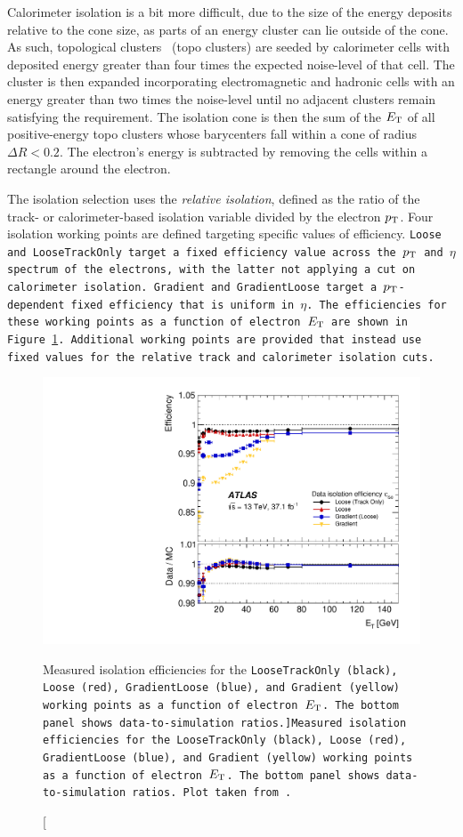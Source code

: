 Calorimeter isolation is a bit more difficult, due to the size of the energy deposits relative to the cone size, as parts of an energy cluster can lie outside of the cone.
As such, topological clusters~\cite{2017.topo-clustering} (topo clusters) are seeded by calorimeter cells with deposited energy greater than four times the expected noise-level of that cell.
The cluster is then expanded incorporating electromagnetic and hadronic cells with an energy greater than two times the noise-level until no adjacent clusters remain satisfying the requirement.
The isolation cone is then the sum of the $E_{\mathrm{T}}$ of all positive-energy topo clusters whose barycenters fall within a cone of radius $\Delta R < 0.2$.
The electron's energy is subtracted by removing the cells within a rectangle around the electron.

The isolation selection uses the \emph{relative isolation}, defined as the ratio of the track- or calorimeter-based isolation variable divided by the electron $p_{\mathrm{T}}$.
Four isolation working points are defined targeting specific values of efficiency.
\tt{Loose} and \tt{LooseTrackOnly} target a fixed efficiency value across the $p_{\mathrm{T}}$ and $\eta$ spectrum of the electrons, with the latter not applying a cut on calorimeter isolation.
\tt{Gradient} and \tt{GradientLoose} target a $p_{\mathrm{T}}$-dependent fixed efficiency that is uniform in $\eta$.
The efficiencies for these working points as a function of electron $E_{\mathrm{T}}$ are shown in Figure~\ref{fig:electron_iso_efficiency}.
Additional working points are provided that instead use fixed values for the relative track and calorimeter isolation cuts.

\begin{figure}[htbp]
  \centering
  \includegraphics[width=.6\textwidth]{figs/detector/electron_iso_efficiency}
  \caption[Measured isolation efficiencies for the \tt{LooseTrackOnly} (black), \tt{Loose} (red), \tt{GradientLoose} (blue), and \tt{Gradient} (yellow) working points as a function of electron $E_{\mathrm{T}}$.  The bottom panel shows data-to-simulation ratios.]{Measured isolation efficiencies for the \tt{LooseTrackOnly} (black), \tt{Loose} (red), \tt{GradientLoose} (blue), and \tt{Gradient} (yellow) working points as a function of electron $E_{\mathrm{T}}$.  The bottom panel shows data-to-simulation ratios.  Plot taken from~\cite{2019.electron-reco-id}.}
  \label{fig:electron_iso_efficiency}
\end{figure}

